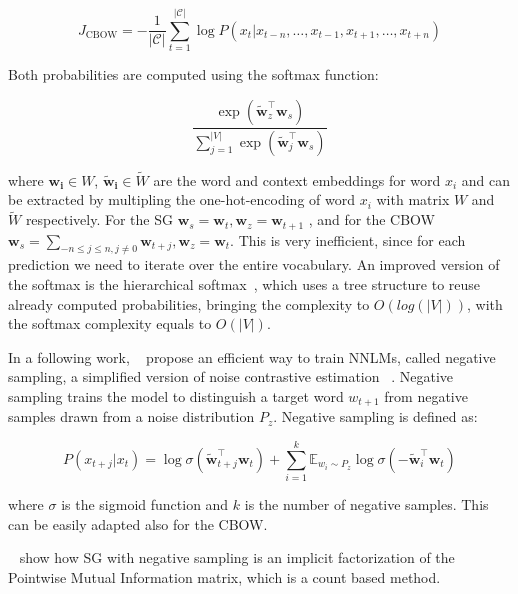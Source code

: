 \begin{equation}
J_{\mathrm{CBOW}}=-\frac{1}{|\mathcal{C}|} \sum_{t=1}^{|\mathcal{C}|} \log P\left(x_{t} | x_{t-n}, \dots, x_{t-1}, x_{t+1}, \dots, x_{t+n}\right)
\end{equation}

Both probabilities are computed using the softmax function:

\begin{equation}
\frac{\exp \left(\tilde{\mathbf{w}}_{z}^{\top} \mathbf{w}_{s}\right)}{\sum_{j=1}^{|V|} \exp \left(\tilde{\mathbf{w}}_{j}^{\top} \mathbf{w}_{s}\right)}
\end{equation}

where $\mathbf{w_i} \in W$, $\mathbf{\tilde{w}_i} \in \tilde{W}$ are the word and context embeddings for word $x_i$ and can be extracted by multipling the one-hot-encoding of word $x_i$ with matrix $W$ and $\tilde{W}$ respectively. For the SG $\mathbf{w}_s = \mathbf{w}_t, \mathbf{w}_z = \mathbf{w}_{t+1}$ , and for the CBOW $\mathbf{w}_s = \sum_{-n \leq j \leq n, j \neq 0} \mathbf{w}_{t+j}, \mathbf{w}_z = \mathbf{w}_{t}$.  This is very inefficient, since for each prediction we need to iterate over the entire vocabulary. An improved version of the softmax is the hierarchical softmax~\citep{Morin05hierarchicalprobabilistic}, which uses a tree structure to reuse already computed probabilities, bringing the complexity to $O(log(|V|))$, with the softmax complexity equals to $O(|V|)$.

In a following work, ~\cite{mikolov2013distributed} propose an efficient way to train NNLMs, called negative sampling, a simplified version of noise contrastive estimation ~\citep{gutmann2012contrastive}. Negative sampling trains the model to distinguish
a target word $w_{t+1}$ from negative samples drawn from a noise distribution $P_z$. Negative sampling is defined as:

\begin{equation}
P\left(x_{t+j} | x_{t}\right)=\log \sigma\left(\tilde{\mathbf{w}}_{t+j}^{\top} \mathbf{w}_{t}\right)+\sum_{i=1}^{k} \mathbb{E}_{w_{i} \sim P_{z}} \log \sigma\left(-\tilde{\mathbf{w}}_{i}^{\top} \mathbf{w}_{t}\right)
\end{equation}

where $\sigma$ is the sigmoid function and $k$ is the number of negative samples. This can be easily adapted also for the CBOW.

~\cite{levy2014embedding_pmi} show how SG with negative sampling is an implicit factorization of the Pointwise Mutual Information matrix, which is a count based        method.

